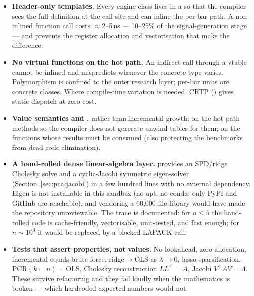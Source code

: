 \begin{itemize}
  \item \textbf{Header-only templates.} Every engine class lives in a  so that
    the compiler sees the full definition at the call site and can inline the per-bar
    path. A non-inlined function call costs $\approx$2--5\,ns --- 10--25\% of the
    signal-generation stage --- and prevents the register allocation and vectorisation
    that make the difference.
  \item \textbf{No virtual functions on the hot path.} An indirect call through a vtable
    cannot be inlined and mispredicts whenever the concrete type varies. Polymorphism is
    confined to the outer research layer; per-bar units are concrete classes. Where
    compile-time variation is needed, CRTP ()
    gives static dispatch at zero cost.
  \item \textbf{Value semantics and .}  rather than
    incremental  growth;  on the hot-path methods so the
    compiler does not generate unwind tables for them; \code{[[nodiscard]]} on the
    functions whose results must be consumed (also protecting the benchmarks from
    dead-code elimination).
  \item \textbf{A hand-rolled dense linear-algebra layer.} 
    provides an SPD/ridge Cholesky solve and a cyclic-Jacobi symmetric eigen-solver
    (Section~\ref{sec:pca:jacobi}) in a few hundred lines with no external dependency.
    Eigen is not installable in this sandbox (no apt, no conda; only PyPI and GitHub are
    reachable), and vendoring a 60{,}000-file library would have made the repository
    unreviewable. The trade is documented: for $n\le5$ the hand-rolled code is
    cache-friendly, vectorisable, unit-tested, and fast enough; for $n\sim10^3$ it would
    be replaced by a blocked LAPACK call.
  \item \textbf{Tests that assert properties, not values.} No-lookahead, zero-allocation,
    incremental-equals-brute-force, ridge$\to$OLS as $\lambda\to0$, lasso sparsification,
    $\mathrm{PCR}(k{=}n)=\mathrm{OLS}$, Cholesky reconstruction $LL^{\top}=A$, Jacobi
    $V^{\top}AV=\Lambda$. These survive refactoring and they fail loudly when the
    mathematics is broken --- which hardcoded expected numbers would not.
\end{itemize}
